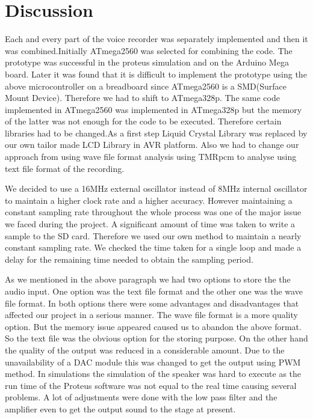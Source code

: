 \documentclass[11pt]{article}
\begin{document}
\section{Discussion}
Each and every part of the voice recorder was separately implemented and then it was combined.Initially ATmega2560 was selected for combining the code. The prototype was successful in the proteus simulation and on the Arduino Mega board. Later it was found that it is difficult to implement the prototype using the above microcontroller on a breadboard since ATmega2560 is a SMD(Surface Mount Device). Therefore we had to shift to ATmega328p. The same code implemented in ATmega2560 was implemented in ATmega328p but the memory of the latter was not enough for the code to be executed. Therefore certain libraries had to be changed.As a first step Liquid Crystal Library was replaced by our own tailor made LCD Library in AVR platform. Also we had to change our approach from using wave file format analysis using TMRpcm to analyse using text file format of the recording.

We decided to use a 16MHz external oscillator instead of 8MHz internal oscillator to maintain a higher clock rate and a higher accuracy. However maintaining a constant sampling rate throughout the whole process was one of the major issue we faced during the project. A significant amount of time was taken to write a sample to the SD card. Therefore we used our own method to maintain a nearly constant sampling rate. We checked the time taken for a single loop and made a delay for the remaining time needed to obtain the sampling period.

As we mentioned in the above paragraph we had two options to store the the audio input. One option was the text file format and the other one was the wave file format. In both options there were some advantages and disadvantages that affected our project in a serious manner. The wave file format is a more quality option. But the memory issue appeared caused us to abandon the above format. So the text file was the obvious option for the storing purpose. On the other hand the quality of the output was reduced in a considerable amount. Due to the unavailability of a DAC module this was changed to get the output using PWM method. In simulations the simulation of the speaker was hard to execute as the run time of the Proteus software was not equal to the real time causing several problems. A lot of adjustments were done with the low pass filter and the amplifier even to get the output sound to the stage at present.
\end{document}
